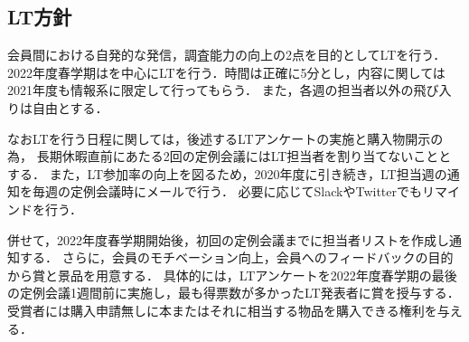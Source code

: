 \subsection*{LT方針}


会員間における自発的な発信，調査能力の向上の2点を目的としてLTを行う．
2022年度春学期は\secondGrade{}を中心にLTを行う．時間は正確に5分とし，内容に関しては2021年度も情報系に限定して行ってもらう．
また，各週の担当者以外の飛び入りは自由とする．

なおLTを行う日程に関しては，後述するLTアンケートの実施と購入物開示の為，
長期休暇直前にあたる2回の定例会議にはLT担当者を割り当てないこととする．
また，LT参加率の向上を図るため，2020年度に引き続き，LT担当週の通知を毎週の定例会議時にメールで行う．
必要に応じてSlackやTwitterでもリマインドを行う．

併せて，2022年度春学期開始後，初回の定例会議までに担当者リストを作成し通知する．
さらに，会員のモチベーション向上，会員へのフィードバックの目的から賞と景品を用意する．
具体的には，LTアンケートを2022年度春学期の最後の定例会議1週間前に実施し，最も得票数が多かったLT発表者に賞を授与する．
受賞者には購入申請無しに本またはそれに相当する物品を購入できる権利を与える．

